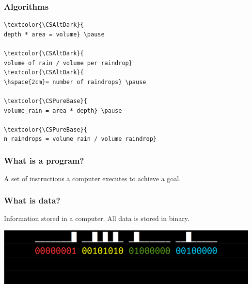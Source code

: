 \documentclass[11pt]{beamer}
\begin{document}
\begin{frame}[fragile]
  \frametitle{Algorithms}
  \Enlarge
  \begin{Verbatim}[commandchars=\\\{\}]
\textcolor{\CSAltDark}{
depth * area = volume} \pause

\textcolor{\CSAltDark}{
volume of rain / volume per raindrop}
\textcolor{\CSAltDark}{
\hspace{2cm}= number of raindrops} \pause

\textcolor{\CSPureBase}{
volume_rain = area * depth} \pause

\textcolor{\CSPureBase}{
n_raindrops = volume_rain / volume_raindrop}
  \end{Verbatim}
\end{frame}

\begin{frame}
  \frametitle{What is a program?}
  \Enlarge

  \begin{itemize} \pause
    \myitem A set of instructions a computer executes to achieve a goal.
  \end{itemize}
\end{frame}

\begin{frame}
  \frametitle{What is data?}
  \Enlarge

  \begin{itemize} \pause
    \myitem Information stored in a computer. \pause
    \myitem All data is stored in binary.
  \end{itemize}
  \includegraphics[width=\textwidth]{./img/assembler-2.png}
\end{frame}
\end{document}
